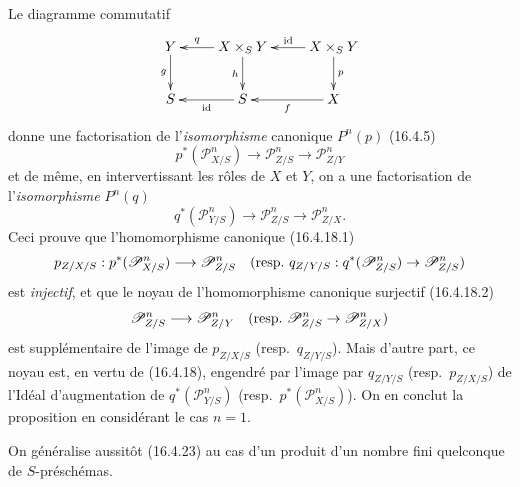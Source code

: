 Le diagramme commutatif
\[
  \xymatrix{
    Y\ar[d]_-g&X\times_S Y\ar[l]_-q\ar[d]_-h&
      X\times_S Y\ar[l]_-{\operatorname{id}}\ar[d]^-p\\
    S&S\ar[l]^-{\operatorname{id}}&X\ar[l]^-f
  }
\]
donne une factorisation de l'\emph{isomorphisme} canonique $P^n(p)$ (16.4.5)
\[
  p^*(\mathscr{P}_{X/S}^n)\longrightarrow
  \mathscr{P}_{Z/S}^n\longrightarrow\mathscr{P}_{Z/Y}^n
\]
et de même, en intervertissant les rôles de $X$ et $Y$, on a une factorisation
de l'\emph{isomorphisme} $P^n(q)$
\[
  q^*(\mathscr{P}_{Y/S}^n)\longrightarrow
  \mathscr{P}_{Z/S}^n\longrightarrow\mathscr{P}_{Z/X}^n.
\]
Ceci prouve que l'homomorphisme canonique (16.4.18.1)
\[
  p_{Z/X/S}:p^*(\mathscr{P}_{X/S}^n)\longrightarrow\mathscr{P}_{Z/S}^n
  \quad\text{(resp.\
  $q_{Z/Y/S}:q^*(\mathscr{P}_{Z/S}^n)\to\mathscr{P}_{Z/S}^n$)}
\]
est \emph{injectif}, et que le noyau de l'homomorphisme canonique surjectif
(16.4.18.2)
\[
  \mathscr{P}_{Z/S}^n\longrightarrow\mathscr{P}_{Z/Y}^n
  \quad\text{(resp.\
  $\mathscr{P}_{Z/S}^n\to\mathscr{P}_{Z/X}^n$)}
\]
est supplémentaire de l'image de $p_{Z/X/S}$ (resp.\ $q_{Z/Y/S}$). Mais
d'autre part, ce noyau est, en vertu de (16.4.18), engendré par l'image par
$q_{Z/Y/S}$ (resp.\ $p_{Z/X/S}$) de l'Idéal d'augmentation de
$q^*(\mathscr{P}_{Y/S}^n)$ (resp.\ $p^*(\mathscr{P}_{X/S}^n)$). On en conclut
la proposition en considérant le cas $n=1$.

On généralise aussitôt (16.4.23) au cas d'un produit d'un nombre fini
quelconque de $S$-préschémas.

